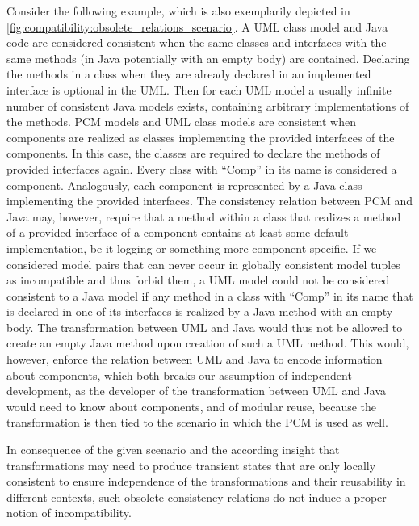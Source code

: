 Consider the following example, which is also exemplarily depicted in \autoref{fig:compatibility:obsolete_relations_scenario}.
A \gls{UML} class model and Java code are considered consistent when the same classes and interfaces with the same methods (in Java potentially with an empty body) are contained.
Declaring the methods in a class when they are already declared in an implemented interface is optional in the \gls{UML}.
Then for each \gls{UML} model a usually infinite number of consistent Java models exists, containing arbitrary implementations of the methods.
\gls{PCM} models and \gls{UML} class models are consistent when components are realized as classes implementing the provided interfaces of the components.
In this case, the classes are required to declare the methods of provided interfaces again.
Every class with \enquote{Comp} in its name is considered a component.
Analogously, each component is represented by a Java class implementing the provided interfaces.
The consistency relation between \gls{PCM} and Java may, however, require that a method within a class that realizes a method of a provided interface of a component contains at least some default implementation, be it logging or something more component-specific.
If we considered model pairs that can never occur in globally consistent model tuples as incompatible and thus forbid them, a \gls{UML} model could not be considered consistent to a Java model if any method in a class with \enquote{Comp} in its name that is declared in one of its interfaces is realized by a Java method with an empty body.
The transformation between \gls{UML} and Java would thus not be allowed to create an empty Java method upon creation of such a \gls{UML} method.
This would, however, enforce the relation between \gls{UML} and Java to encode information about components, which both breaks our assumption of independent development, as the developer of the transformation between \gls{UML} and Java would need to know about components, and of modular reuse, because the transformation is then tied to the scenario in which the \gls{PCM} is used as well.

In consequence of the given scenario and the according insight that transformations may need to produce transient states that are only locally consistent to ensure independence of the transformations and their reusability in different contexts, such obsolete consistency relations do not induce a proper notion of incompatibility.

